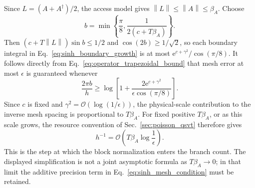 \documentclass[aps,pra,reprint,floatfix,unsortedaddress,superscriptaddress]{revtex4-2}
\newcommand{\norm}[1]{\left\lVert#1\right\rVert}
\newcommand{\Ocal}{\mathcal{O}}
\begin{document}
Since $L=(A+A^\dagger)/2$, the access model gives
$\norm{L}\leq\norm{A}\leq\beta_A$.  Choose
\begin{equation}
    b=\min\!\left\{
        \frac{\pi}{8},\frac{1}{2(c+T\beta_A)}
    \right\}.
    \label{eq:sinh_strip_choice}
\end{equation}
Then $(c+T\norm{L})\sin b\leq1/2$ and
$\cos(2b)\geq1/\sqrt2$, so each boundary integral in
Eq.~\eqref{eq:sinh_boundary_growth} is at most
$\mathrm e^{c+\gamma^2}/\cos(\pi/8)$.  It follows directly from
Eq.~\eqref{eq:operator_trapezoidal_bound} that mesh error at most
$\epsilon$ is guaranteed whenever
\begin{equation}
    \frac{2\pi b}{h}
    \geq
    \log\!\left[
        1+\frac{2\mathrm e^{c+\gamma^2}}
        {\epsilon\cos(\pi/8)}
    \right].
    \label{eq:sinh_mesh_condition}
\end{equation}
Since $c$ is fixed and
$\gamma^2=\Ocal(\log(1/\epsilon))$, the physical-scale contribution to
the inverse mesh spacing is proportional to $T\beta_A$.  For fixed
positive $T\beta_A$, or as this scale grows, the resource convention of
Sec.~\ref{sec:poisson_qsvt} therefore gives
\begin{equation}
    h^{-1}
    =
    \Ocal\!\left(
        T\beta_A\log\frac{1}{\epsilon}
    \right).
    \label{eq:sinh_mesh_spacing}
\end{equation}
This is the step at which the block normalization enters the branch
count.  The displayed simplification is not a joint asymptotic formula
as $T\beta_A\to0$; in that limit the additive precision term in
Eq.~\eqref{eq:sinh_mesh_condition} must be retained.
\end{document}

